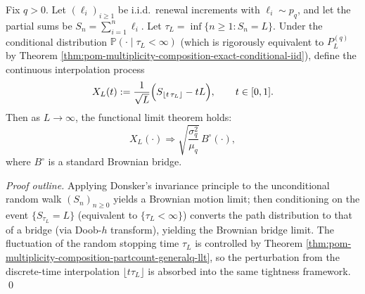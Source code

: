 \begin{theorem}\label{thm:pom-multiplicity-composition-brown-bridge-invariance}
Fix \(q>0\). Let \((\ell_i)_{i\ge 1}\) be i.i.d.\ renewal increments with \(\ell_i\sim p_q\), and let the partial sums be \(S_n=\sum_{i=1}^n\ell_i\).
Let \(\tau_L=\inf\{n\ge 1:S_n=L\}\).
Under the conditional distribution \(\mathbb{P}(\cdot\mid\tau_L<\infty)\) (which is rigorously equivalent to \(P_L^{(q)}\) by Theorem \ref{thm:pom-multiplicity-composition-exact-conditional-iid}), define the continuous interpolation process
\[
X_L(t):=\frac{1}{\sqrt{L}}\Bigl(S_{\lfloor t\,\tau_L\rfloor}-tL\Bigr),\qquad t\in[0,1].
\]
Then as \(L\to\infty\), the functional limit theorem holds:
\[
X_L(\cdot)\Longrightarrow \sqrt{\frac{\sigma_q^2}{\mu_q}}\,B^\circ(\cdot),
\]
where \(B^\circ\) is a standard Brownian bridge.
\end{theorem}
\begin{proof}[Proof outline]
Applying Donsker's invariance principle to the unconditional random walk \((S_n)_{n\ge 0}\) yields a Brownian motion limit;
then conditioning on the event \(\{S_{\tau_L}=L\}\) (equivalent to \(\{\tau_L<\infty\}\)) converts the path distribution to that of a bridge (via Doob-\(h\) transform), yielding the Brownian bridge limit.
The fluctuation of the random stopping time \(\tau_L\) is controlled by Theorem \ref{thm:pom-multiplicity-composition-partcount-generalq-llt},
so the perturbation from the discrete-time interpolation \(\lfloor t\tau_L\rfloor\) is absorbed into the same tightness framework. \qed
\end{proof}
